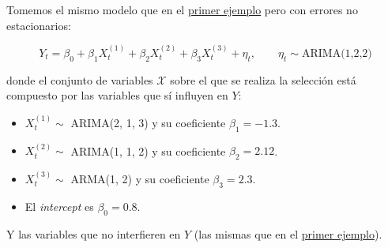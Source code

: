 \documentclass[
  12pt,
  a4paper]{article}
\newenvironment{Shaded}{\begin{snugshade}}{\end{snugshade}}
\newcommand{\CommentTok}[1]{\textcolor[rgb]{0.56,0.35,0.01}{\textit{#1}}}
\newcommand{\FloatTok}[1]{\textcolor[rgb]{0.00,0.00,0.81}{#1}}
\newcommand{\FunctionTok}[1]{\textcolor[rgb]{0.00,0.00,0.00}{#1}}
\newcommand{\NormalTok}[1]{#1}
\newcommand{\OtherTok}[1]{\textcolor[rgb]{0.56,0.35,0.01}{#1}}
\newcommand{\SpecialCharTok}[1]{\textcolor[rgb]{0.00,0.00,0.00}{#1}}
\newcommand{\StringTok}[1]{\textcolor[rgb]{0.31,0.60,0.02}{#1}}
\providecommand{\tightlist}{%
  \setlength{\itemsep}{0pt}\setlength{\parskip}{0pt}}
\begin{document}
Tomemos el mismo modelo que en el \protect\hyperlink{ejemplo1}{primer
ejemplo} pero con errores no estacionarios:

\begin{equation}\label{eq:ejemplo3}
     Y_t = \beta_0 + \beta_1 X_t^{(1)} + \beta_2 X_t^{(2)} + \beta_3 X_t^{(3)} + \eta_t, \qquad \eta_t\sim\text{ARIMA(1,2,2)}
\end{equation}

donde el conjunto de variables \(\mathcal{X}\) sobre el que se realiza
la selección está compuesto por las variables que sí influyen en \(Y\):

\begin{itemize}
\tightlist
\item
  \(X_t^{(1)} \sim\) ARIMA(2, 1, 3) y su coeficiente \(\beta_1 = -1.3\).
\item
  \(X_t^{(2)} \sim\) ARIMA(1, 1, 2) y su coeficiente \(\beta_2 = 2.12\).
\item
  \(X_t^{(3)} \sim\) ARMA(1, 2) y su coeficiente \(\beta_3 = 2.3\).
\item
  El \emph{intercept} es \(\beta_0=0.8\).
\end{itemize}

Y las variables que no interfieren en \(Y\) (las mismas que en el
\protect\hyperlink{ejemplo1}{primer ejemplo}).

\begin{Shaded}
\end{Shaded}
\end{document}
